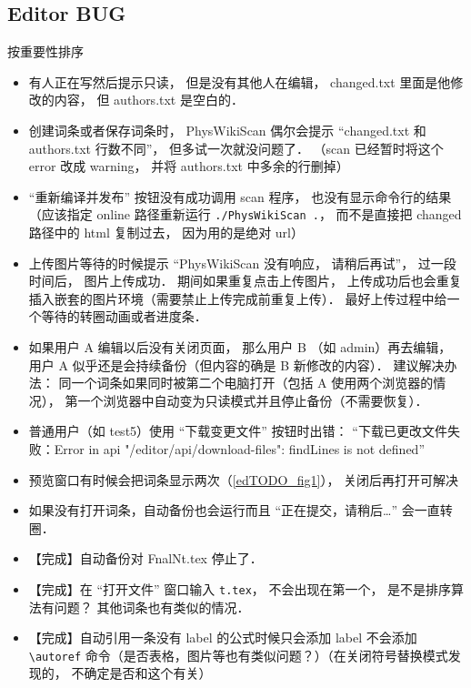\subsection{Editor BUG}
按重要性排序
\begin{itemize}
\item 有人正在写然后提示只读， 但是没有其他人在编辑， changed.txt 里面是他修改的内容， 但 authors.txt 是空白的．

\item 创建词条或者保存词条时， PhysWikiScan 偶尔会提示 “changed.txt 和 authors.txt 行数不同”， 但多试一次就没问题了． （scan 已经暂时将这个 error 改成 warning， 并将 authors.txt 中多余的行删掉）

\item “重新编译并发布” 按钮没有成功调用 scan 程序， 也没有显示命令行的结果（应该指定 online 路径重新运行 \verb|./PhysWikiScan .|， 而不是直接把 changed 路径中的 html 复制过去， 因为用的是绝对 url）

\item 上传图片等待的时候提示 “PhysWikiScan 没有响应， 请稍后再试”， 过一段时间后， 图片上传成功． 期间如果重复点击上传图片， 上传成功后也会重复插入嵌套的图片环境（需要禁止上传完成前重复上传）． 最好上传过程中给一个等待的转圈动画或者进度条．

\item 如果用户 A 编辑以后没有关闭页面， 那么用户 B （如 admin）再去编辑， 用户 A 似乎还是会持续备份（但内容的确是 B 新修改的内容）． 建议解决办法： 同一个词条如果同时被第二个电脑打开（包括 A 使用两个浏览器的情况）， 第一个浏览器中自动变为只读模式并且停止备份（不需要恢复）．

\item 普通用户（如 test5）使用 “下载变更文件” 按钮时出错： “下载已更改文件失败：Error in api "/editor/api/download-files": findLines is not defined”

\item 预览窗口有时候会把词条显示两次（\autoref{edTODO_fig1}）， 关闭后再打开可解决

\item 如果没有打开词条，自动备份也会运行而且 “正在提交，请稍后…” 会一直转圈．

\item 【完成】自动备份对 FnalNt.tex 停止了．

\item 【完成】在 “打开文件” 窗口输入 \lstinline|t.tex|， 不会出现在第一个， 是不是排序算法有问题？ 其他词条也有类似的情况．

\item 【完成】自动引用一条没有 label 的公式时候只会添加 label 不会添加 \lstinline|\autoref| 命令（是否表格，图片等也有类似问题？）（在关闭符号替换模式发现的， 不确定是否和这个有关）


\end{itemize}
